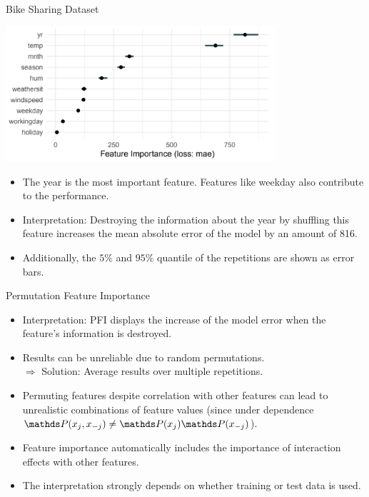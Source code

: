 \documentclass[11pt,compress,t,notes=noshow, xcolor=table]{beamer}
\begin{document}
\begin{vbframe}{Bike Sharing Dataset}

\begin{center}
\includegraphics[width=0.75\textwidth]{figure_man/bike-sharing02.png}
\end{center}

\begin{itemize}
 \item The year is the most important feature. Features like weekday also contribute to the performance.
 \item Interpretation: Destroying the information about the year by shuffling this feature increases the mean absolute error of the model by an amount of 816.
 \item Additionally, the $5 \%$ and $95 \%$ quantile of the repetitions are shown as error bars.
\end{itemize}
\end{vbframe}

\begin{vbframe}{Permutation Feature Importance}
 \begin{itemize}
 \itemsep1em
  \item Interpretation: PFI displays the increase of the model error when the feature's information is destroyed.
  \item Results can be unreliable due to random permutations. \\
  $\Rightarrow$ Solution: Average results over multiple repetitions.
  \item Permuting features despite correlation with other features can lead to unrealistic combinations of feature values (since under dependence $\P(x_j,x_{-j}) \neq \P(x_j) \P(x_{-j})$).
  \item Feature importance automatically includes the importance of interaction effects with other features.
  \item The interpretation strongly depends on whether training or test data is used.\\
 \end{itemize}
\end{vbframe}
\end{document}
